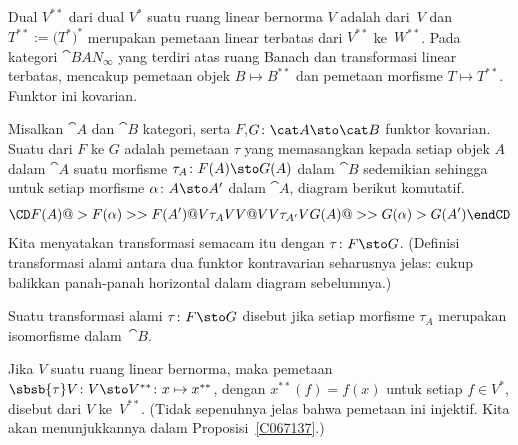 \begin{exam}\label{C057717}
Dual $V^{**}$ dari dual $V^*$ suatu ruang linear bernorma $V$ adalah  dari~$V$
dan $T^{**} := \bigl(T^*\bigr)^*$ merupakan pemetaan linear terbatas dari $V^{**}$ ke~$W^{**}$.  Pada kategori
$\cat{BAN_{\boldsymbol\infty}}$ yang terdiri atas ruang Banach dan transformasi linear terbatas,
 mencakup pemetaan objek $B \mapsto B^{**}$ dan pemetaan morfisme $T \mapsto T^{**}$.
Funktor ini kovarian.
\end{exam}

\begin{defn}\label{defn_nat_transf} Misalkan $\cat A$ dan $\cat B$ kategori, serta $F$,$G \colon \cat A \sto \cat B$
funktor kovarian.  Suatu
 dari $F$ ke $G$ adalah pemetaan $\tau$ yang memasangkan kepada setiap objek
$A$ dalam $\cat A$ suatu morfisme $\tau_A \colon F(A) \sto G(A)$ dalam $\cat B$ sedemikian sehingga
untuk setiap morfisme $\alpha \colon A \sto A'$ dalam $\cat A$, diagram berikut komutatif.
   \[ \CD
      F(A) @>  F(\alpha)>>  F(A')  \\
         @V\tau_AVV                @VV\tau_{A'}V  \\
      G(A) @>> G(\alpha)>  G(A')
   \endCD \]
Kita menyatakan transformasi semacam itu dengan $\tau \colon F \sto G$. (Definisi transformasi alami
antara dua funktor kontravarian seharusnya jelas: cukup balikkan
panah-panah horizontal dalam diagram sebelumnya.)

Suatu transformasi alami $\tau \colon  F \sto G$ disebut
 jika setiap morfisme $\tau_A$ merupakan isomorfisme dalam~$\cat B$.
\end{defn}

\begin{defn}\label{defn_nat_embed} Jika $V$ suatu ruang linear bernorma, maka pemetaan $\sbsb{\tau}V \colon V \sto V^{**} \colon x
\mapsto x^{**}$, dengan $x^{**}(f) = f(x)$ untuk setiap $f \in V^*$, disebut
 dari $V$ ke~$V^{**}$. (Tidak sepenuhnya jelas bahwa pemetaan ini
injektif. Kita akan menunjukkannya dalam Proposisi~\ref{C067137}.)
\end{defn}

